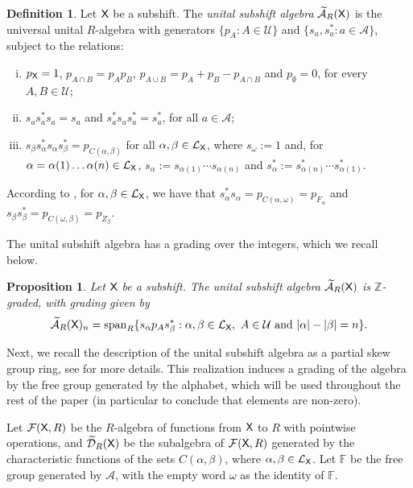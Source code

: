 \documentclass[a4paper,12pt]{amsart}
\newtheorem{proposition}[equation]{Proposition}
\theoremstyle{definition}
\newtheorem{definition}[equation]{Definition}
\theoremstyle{remark}
\numberwithin{equation}{section}
\newcommand{\osf}{{\normalfont \textsf{X}}}
\newcommand{\lang}{\CL_{\osf}}
\newcommand{\ualgshift}{\TCA_R(\osf)}
\newcommand{\udalgshift}{\TCD_R(\osf)}
\newcommand{\alf}{\mathscr{A}}
\newcommand{\F}{\mathbb{F}}
\newcommand{\CA}{\mathcal{A}}
\newcommand{\CD}{\mathcal{D}}
\newcommand{\CF}{\mathcal{F}}
\newcommand{\CL}{\mathcal{L}}
\newcommand{\TCA}{\widetilde{\CA}}
\newcommand{\TCB}{\mathcal{U}}
\newcommand{\TCD}{\widetilde{\CD}}
\newcommand{\zn}{\mathbb{Z}}
\newcommand{\eword}{\omega}
\newcommand{\vecspan}{\operatorname{span}}
\begin{document}

\begin{definition}\cite[Definition 3.3]{BGGV}\label{gelado} Let $\osf$ be a subshift.
The \emph{unital subshift algebra} $\ualgshift$ is the universal unital $R$-algebra  with generators $\{p_A: A\in\TCB\}$ and $\{s_a,s_a^*: a\in\alf\}$, subject to the relations:
\begin{enumerate}[(i)]
    \item $p_{\osf}=1$, $p_{A\cap B}=p_Ap_B$, $p_{A\cup B}=p_A+p_B-p_{A\cap B}$ and $p_{\emptyset}=0$, for every $A,B\in\TCB$;\vspace{.1cm}
    \item $s_as_a^*s_a=s_a$ and $s_a^*s_as_a^*=s_a^*$, for all $a\in\alf$;\vspace{.1cm}
    \item $s_{\beta}s^*_{\alpha}s_{\alpha}s^*_{\beta}=p_{C(\alpha,\beta)}$ for all $\alpha,\beta\in\lang$, where $s_{\eword}:=1$ and, for $\alpha=\alpha(1)\ldots\alpha(n)\in\lang$, $s_\alpha:=s_{\alpha(1)}\cdots s_{\alpha(n)}$ and $s_\alpha^*:=s_{\alpha(n)}^*\cdots s_{\alpha(1)}^*$.
\end{enumerate}
\end{definition}

According to \cite[Remark 3.4]{BGGV}, for $\alpha, \beta\in\lang$, we have that $s_\alpha^* s_\alpha = p_{C(\alpha,\omega)}=p_{F_\alpha}$ and $s_\beta s_\beta^* = p_{C(\omega,\beta)}= p_{Z_\beta}$.

The unital subshift algebra has a grading over the integers, which we recall below.

 \begin{proposition}\label{prop:grading} \cite[Proposition~3.9]{BGGV} Let $\osf$ be a subshift. The unital subshift algebra $\ualgshift$ is $\zn$-graded, with grading given by
     \[\ualgshift_n = \vecspan_R\{s_\alpha p_A s_\beta^* : \alpha,\beta \in \lang,\ A\in\TCB \ \mbox{and} \ |\alpha|-|\beta|=n\}.\]
 \end{proposition}

Next, we recall the description of the unital subshift algebra as a partial skew group ring, see \cite[$\S\,$5.1]{BGGV} for more details. This realization induces a grading of the algebra by the free group generated by the alphabet, which will be used throughout the rest of the paper (in particular to conclude that elements are non-zero). 

 Let $\CF(\osf,R)$ be the $R$-algebra of functions from $\osf$ to $R$ with pointwise operations, and $\udalgshift$ be the subalgebra of $\CF(\osf,R)$ generated by the characteristic functions of the sets $C(\alpha,\beta)$, where $\alpha,\beta\in\lang$. Let $\F$ be the free group generated by $\alf$, with the empty word $\eword$ as the identity of $\F$.
\end{document}
